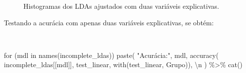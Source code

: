 \documentclass[
  a4paperpaper,
]{article}
\newenvironment{Shaded}{\begin{snugshade}}{\end{snugshade}}
\newcommand{\ControlFlowTok}[1]{\textcolor[rgb]{0.00,0.23,0.31}{#1}}
\newcommand{\FunctionTok}[1]{\textcolor[rgb]{0.28,0.35,0.67}{#1}}
\newcommand{\NormalTok}[1]{\textcolor[rgb]{0.00,0.23,0.31}{#1}}
\newcommand{\SpecialCharTok}[1]{\textcolor[rgb]{0.37,0.37,0.37}{#1}}
\newcommand{\StringTok}[1]{\textcolor[rgb]{0.13,0.47,0.30}{#1}}
\begin{document}
\begin{figure}[H]
\begin{minipage}{0.50\linewidth}
{}


\end{minipage}%
\newline
\begin{minipage}{0.50\linewidth}



\end{minipage}%

\caption{\label{fig-elephants}Histogramas dos LDAs ajustados com duas
variáveis explicativas.}

\end{figure}%

Testando a acurácia com apenas duas variáveis explicativas, se obtém:

~

\begin{Shaded}
\begin{Highlighting}[]
\ControlFlowTok{for}\NormalTok{ (mdl }\ControlFlowTok{in} \FunctionTok{names}\NormalTok{(incomplete\_ldas)) }\FunctionTok{paste}\NormalTok{(}
  \StringTok{"Acurácia:"}\NormalTok{, mdl, }\FunctionTok{accuracy}\NormalTok{(}
\NormalTok{    incomplete\_ldas[[mdl]],}
\NormalTok{    test\_linear,}
    \FunctionTok{with}\NormalTok{(test\_linear, Grupo)), }\StringTok{\textquotesingle{}}\SpecialCharTok{\textbackslash{}n}\StringTok{\textquotesingle{}}
\NormalTok{) }\SpecialCharTok{\%\textgreater{}\%}
  \FunctionTok{cat}\NormalTok{()}
\end{Highlighting}
\end{Shaded}
\end{document}
